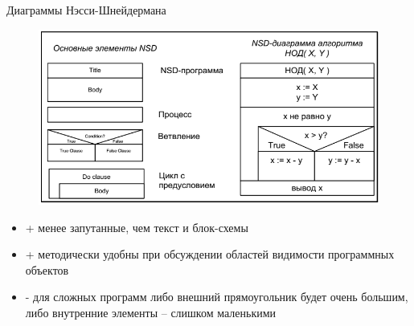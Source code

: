 \documentclass{beamer}
\begin{document}
\begin{frame}
\begin{block}{Диаграммы Нэсси-Шнейдермана}
\begin{figure}[h]
\centering
\includegraphics[scale=0.35]{images/lec01-pic03.png}
\end{figure}
\end{block}
\begin{itemize}
\item + менее запутанные, чем текст и блок-схемы
\item + методически удобны при обсуждении областей видимости программных объектов
\item - для сложных программ либо внешний прямоугольник будет очень большим, либо внутренние элементы – слишком маленькими
\end{itemize}
\end{frame}
\end{document}
